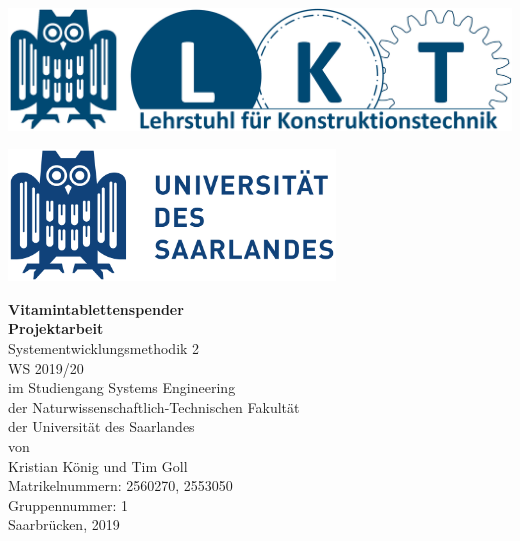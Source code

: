 \documentclass[a4paper,12pt, headings=small, bibtotoc, numbers=noenddot]{scrreprt} %
\begin{document}
\pagestyle{empty}   %


\label{Coversheet}
\begin{minipage}{0.5\textwidth}
\begin{flushleft}
\includegraphics[width=\textwidth]{chapter/Bilder/LKT_logo.png}
\end{flushleft}
\end{minipage}
\begin{minipage}{0.5\textwidth}
\begin{flushright}
\includegraphics[width=0.65\textwidth]{chapter/Bilder/UdS_Logo.png}
\end{flushright}
\end{minipage}
\headrule

\vspace{1.5cm}

\begin{center}
\LARGE \textbf{Vitamintablettenspender}\\ 
\vspace{3cm}
\textbf{Projektarbeit} \\
\Large Systementwicklungsmethodik 2\\ 
WS 2019/20\\
im Studiengang Systems Engineering\\
der Naturwissenschaftlich-Technischen Fakultät \\
der Universität des Saarlandes\\
\vspace{2.5cm}
\Large von\\
\vspace{1cm}
Kristian König und Tim Goll\\
Matrikelnummern: 2560270, 2553050 \\
Gruppennummer: 1\\
\vspace{1cm}
Saarbrücken, 2019
\end{center}
\newpage 
\end{document}
